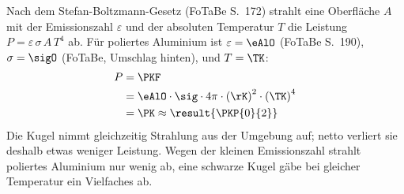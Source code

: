 Nach dem Stefan-Boltzmann-Gesetz (FoTaBe S.~172) strahlt eine Oberfläche $A$ mit der Emissionszahl $\varepsilon$ und der absoluten Temperatur $T$ die Leistung $P = \varepsilon\,\sigma\,A\,T^4$ ab. Für poliertes Aluminium ist $\varepsilon = \eAlO$ (FoTaBe S.~190), $\sigma = \sigO$ (FoTaBe, Umschlag hinten), und $T = \TK$:
\begin{align}
 P &= \PKF \\
   &= \eAlO\cdot\sig\cdot4\pi\cdot\left(\rK\right)^2\cdot\left(\TK\right)^4 \\
   &= \PK \approx \result{\PKP{0}{2}}
\end{align}
Die Kugel nimmt gleichzeitig Strahlung aus der Umgebung auf; netto verliert sie deshalb etwas weniger Leistung. Wegen der kleinen Emissionszahl strahlt poliertes Aluminium nur wenig ab, eine schwarze Kugel gäbe bei gleicher Temperatur ein Vielfaches ab.
